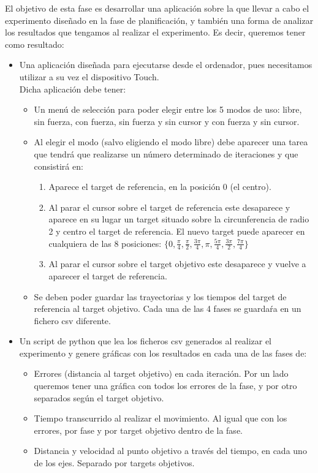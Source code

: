 \documentclass[a4paper,11pt, oneside]{book}
\begin{document}
El objetivo de esta fase es desarrollar una aplicación sobre la que llevar a cabo el experimento diseñado en la fase de planificación, y también una forma de analizar los resultados que tengamos al realizar el experimento. Es decir, queremos tener como resultado:
\begin{itemize}
	\item Una aplicación diseñada para ejecutarse desde el ordenador, pues necesitamos utilizar a su vez el dispositivo Touch. \\
	Dicha aplicación debe tener:
	\begin{itemize}
		\item Un menú de selección para poder elegir entre los 5 modos de uso: libre, sin fuerza, con fuerza, sin fuerza y sin cursor y con fuerza y sin cursor.
		\item Al elegir el modo (salvo eligiendo el modo libre) debe aparecer una tarea que tendrá que realizarse un número determinado de iteraciones y que consistirá en:
		\begin{enumerate}
			\item Aparece el target de referencia, en la posición 0 (el centro).
			\item Al parar el cursor sobre el target de referencia este desaparece y aparece en su lugar un target situado sobre la circunferencia de radio 2 y centro el target de referencia. El nuevo target puede aparecer en cualquiera de las 8 posiciones: $\{0, \frac{\pi}{4}, \frac{\pi}{2}, \frac{3\pi}{4}, \pi, \frac{5\pi}{4}, \frac{3\pi}{2}, \frac{7\pi}{4}\}$
			\item Al parar el cursor sobre el target objetivo este desaparece y vuelve a aparecer el target de referencia.
		\end{enumerate}
		\item Se deben poder guardar las trayectorias y los tiempos del target de referencia al target objetivo. Cada una de las 4 fases se guardaŕa en un fichero csv diferente.
	\end{itemize}
	\item Un script de python que lea los ficheros csv generados al realizar el experimento y genere gráficas con los resultados en cada una de las fases de:
	\begin{itemize}
		\item Errores (distancia al target objetivo) en cada iteración. Por un lado queremos tener una gráfica con todos los errores de la fase, y por otro separados según el target objetivo.
		\item Tiempo transcurrido al realizar el movimiento. Al igual que con los errores, por fase y por target objetivo dentro de la fase.
		\item Distancia y velocidad al punto objetivo a través del tiempo, en cada uno de los ejes. Separado por targets objetivos.
	\end{itemize}
\end{itemize}
\end{document}
